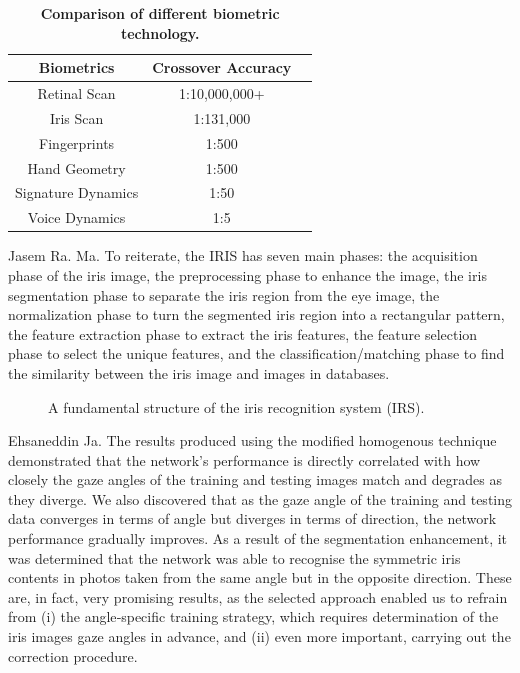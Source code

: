 \documentclass[9pt,twocolumn,twoside]{osajnl}
\begin{document}
\begin{table}[htbp]
\centering
\caption{\bf Comparison of different biometric technology.}
\begin{tabular}{ccc}
\hline
Biometrics & Crossover Accuracy  \\
\hline
Retinal Scan & 1:10,000,000+ \\
Iris Scan & 1:131,000 \\
Fingerprints & 1:500 \\
Hand Geometry & 1:500 \\
Signature Dynamics & 1:50 \\
Voice Dynamics & 1:5 \\
\hline
\end{tabular}
  \label{tab:shapefunctions}
\end{table}

Jasem Ra. Ma. \cite{sam:3} To reiterate, the IRIS has seven main phases: the acquisition phase of the iris image, the preprocessing phase to enhance the image, the iris segmentation phase to separate the iris region from the eye image, the normalization phase to turn the segmented iris region into a rectangular pattern, the feature extraction phase to extract the iris features, the feature selection phase to select the unique features, and the classification/matching phase to find the similarity between the iris image and images in databases.

\begin{figure}[htbp]
\centering
{}
\caption{A fundamental structure of the iris recognition system (IRS).}
\label{fig:Fundamental Structure}
\end{figure}

Ehsaneddin Ja. \cite{sam:4} The results produced using the modified homogenous technique demonstrated that the network's performance is directly correlated with how closely the gaze angles of the training and testing images match and degrades as they diverge. We also discovered that as the gaze angle of the training and testing data converges in terms of angle but diverges in terms of direction, the network performance gradually improves. As a result of the segmentation enhancement, it was determined that the network was able to recognise the symmetric iris contents in photos taken from the same angle but in the opposite direction. These are, in fact, very promising results, as the selected approach enabled us to refrain from (i) the angle‐specific training strategy, which requires determination of the iris images gaze angles in advance, and (ii) even more important, carrying out the correction procedure.
\end{document}
